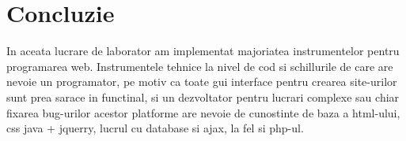 \section*{Concluzie}


In aceata lucrare de laborator am implementat majoriatea instrumentelor pentru programarea web. Instrumentele tehnice la nivel de cod si schillurile de care are nevoie un programator, pe motiv ca toate gui interface pentru crearea site-urilor sunt prea sarace in functinal, si un dezvoltator pentru lucrari complexe sau chiar fixarea bug-urilor acestor platforme are nevoie de cunostinte de baza a html-ului, css java + jquerry, lucrul cu database si ajax, la fel si php-ul.

\clearpage